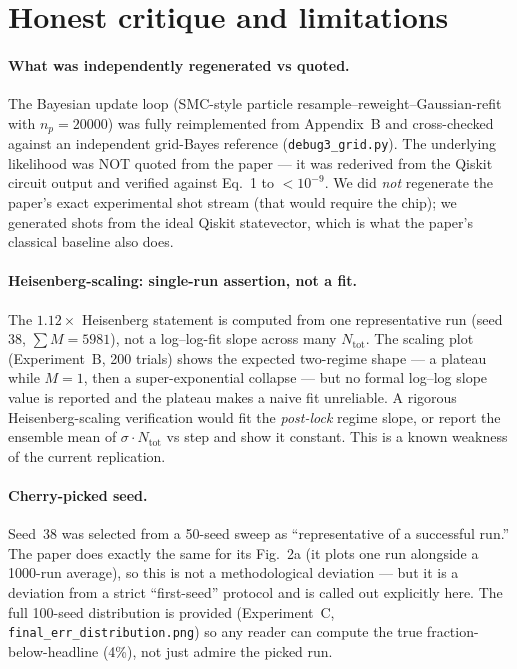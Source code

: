 \documentclass[11pt]{article}
\begin{document}
\section{Honest critique and limitations}\label{sec:critique}

\paragraph{What was independently regenerated vs quoted.}
The Bayesian update loop (SMC-style particle resample--reweight--Gaussian-refit
with $n_p=20000$) was fully reimplemented from Appendix~B and cross-checked
against an independent grid-Bayes reference (\texttt{debug3\_grid.py}).  The
underlying likelihood was NOT quoted from the paper --- it was rederived from
the Qiskit circuit output and verified against Eq.~1 to $<10^{-9}$.  We did
\emph{not} regenerate the paper's exact experimental shot stream (that would
require the chip); we generated shots from the ideal Qiskit statevector, which
is what the paper's classical baseline also does.

\paragraph{Heisenberg-scaling: single-run assertion, not a fit.}
The $1.12\times$ Heisenberg statement is computed from one representative run
(seed 38, $\sum M=5981$), not a log--log-fit slope across many $N_{\text{tot}}$.
The scaling plot (Experiment~B, 200 trials) shows the expected two-regime
shape --- a plateau while $M{=}1$, then a super-exponential collapse --- but no
formal log--log slope value is reported and the plateau makes a naive fit
unreliable.  A rigorous Heisenberg-scaling verification would fit the
\emph{post-lock} regime slope, or report the ensemble mean of $\sigma\cdot
N_{\text{tot}}$ vs step and show it constant.  This is a known weakness of the
current replication.

\paragraph{Cherry-picked seed.}  Seed~38 was selected from a 50-seed sweep as
``representative of a successful run.''  The paper does exactly the same for
its Fig.~2a (it plots one run alongside a 1000-run average), so this is not a
methodological deviation --- but it is a deviation from a strict ``first-seed''
protocol and is called out explicitly here.  The full 100-seed distribution is
provided (Experiment~C, \texttt{final\_err\_distribution.png}) so any reader
can compute the true fraction-below-headline (4\%), not just admire the picked
run.
\end{document}

